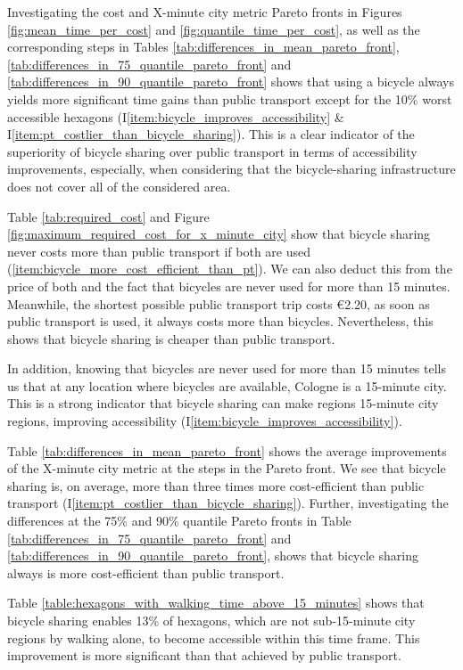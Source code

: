 Investigating the cost and X-minute city metric Pareto fronts in Figures \ref{fig:mean_time_per_cost} and \ref{fig:quantile_time_per_cost}, as well as the corresponding steps in Tables \ref{tab:differences_in_mean_pareto_front}, \ref{tab:differences_in_75_quantile_pareto_front} and \ref{tab:differences_in_90_quantile_pareto_front} shows that using a bicycle always yields more significant time gains than public transport except for the 10\% worst accessible hexagons (I\ref{item:bicycle_improves_accessibility} \& I\ref{item:pt_costlier_than_bicycle_sharing}).
This is a clear indicator of the superiority of bicycle sharing over public transport in terms of accessibility improvements, especially, when considering that the bicycle-sharing infrastructure does not cover all of the considered area.

Table \ref{tab:required_cost} and Figure \ref{fig:maximum_required_cost_for_x_minute_city} show that bicycle sharing never costs more than public transport if both are used (\ref{item:bicycle_more_cost_efficient_than_pt}).
We can also deduct this from the price of both and the fact that bicycles are never used for more than 15 minutes.
Meanwhile, the shortest possible public transport trip costs \euro{2.20}, as soon as public transport is used, it always costs more than bicycles.
Nevertheless, this shows that bicycle sharing is cheaper than public transport. 

In addition, knowing that bicycles are never used for more than 15 minutes tells us that at any location where bicycles are available, Cologne is a 15-minute city.
This is a strong indicator that bicycle sharing can make regions 15-minute city regions, improving accessibility (I\ref{item:bicycle_improves_accessibility}).

Table \ref{tab:differences_in_mean_pareto_front} shows the average improvements of the X-minute city metric at the steps in the Pareto front.
We see that bicycle sharing is, on average, more than three times more cost-efficient than public transport (I\ref{item:pt_costlier_than_bicycle_sharing}).
Further, investigating the differences at the 75\% and 90\% quantile Pareto fronts in Table \ref{tab:differences_in_75_quantile_pareto_front} and \ref{tab:differences_in_90_quantile_pareto_front}, shows that bicycle sharing always is more cost-efficient than public transport.

Table \ref{table:hexagons_with_walking_time_above_15_minutes} shows that bicycle sharing enables 13\% of hexagons, which are not sub-15-minute city regions by walking alone, to become accessible within this time frame. 
This improvement is more significant than that achieved by public transport.


